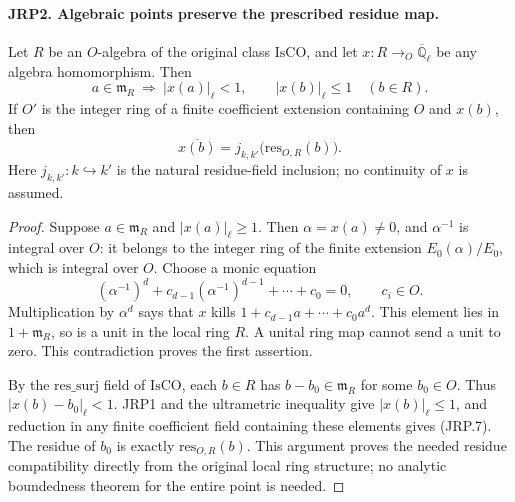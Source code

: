 \documentclass[11pt,a4paper]{article}
\numberwithin{equation}{section}
\theoremstyle{remark}\newtheorem{remark}[theorem]{Remark}
\begin{document}
\paragraph{JRP2. Algebraic points preserve the prescribed residue map.}
\label{claim:JRP2}
Let \(R\) be an \(O\)-algebra of the original class
\(\mathrm{IsCO}\), and let
\(x:R\to_O\overline{\mathbb Q}_\ell\) be any algebra homomorphism.
Then
\[
 a\in\mathfrak m_R\ \Longrightarrow\ |x(a)|_\ell<1,
 \qquad |x(b)|_\ell\le1\quad(b\in R).
 \tag{JRP.6}
\]
If \(O'\) is the integer ring of a finite coefficient extension
containing \(O\) and \(x(b)\), then
\[
 \overline{x(b)}=j_{k,k'}\bigl(\mathrm{res}_{O,R}(b)\bigr).
 \tag{JRP.7}
\]
Here \(j_{k,k'}:k\hookrightarrow k'\) is the natural residue-field
inclusion; no continuity of \(x\) is assumed.
\begin{proof}
Suppose \(a\in\mathfrak m_R\) and \(|x(a)|_\ell\ge1\).
Then \(\alpha=x(a)\ne0\), and \(\alpha^{-1}\) is integral
over \(O\): it belongs to the integer ring of the finite extension
\(E_0(\alpha)/E_0\), which is integral over \(O\).
Choose a monic equation
\[
 (\alpha^{-1})^d+c_{d-1}(\alpha^{-1})^{d-1}
                    +\cdots+c_0=0,\qquad c_i\in O.
\]
Multiplication by \(\alpha^d\) says that \(x\) kills
\(1+c_{d-1}a+\cdots+c_0a^d\).  This element lies in
\(1+\mathfrak m_R\), so is a unit in the local ring \(R\).
A unital ring map cannot send a unit to zero.  This contradiction
proves the first assertion.

By the \(\mathrm{res\_\allowbreak surj}\) field of \(\mathrm{IsCO}\),
each \(b\in R\) has \(b-b_0\in\mathfrak m_R\) for some
\(b_0\in O\).  Thus \(|x(b)-b_0|_\ell<1\).
JRP1 and the ultrametric inequality give \(|x(b)|_\ell\le1\),
and reduction in any finite coefficient field containing these
elements gives (JRP.7).  The residue of \(b_0\) is exactly
\(\mathrm{res}_{O,R}(b)\).  This argument proves the needed
residue compatibility directly from the original local ring
structure; no analytic boundedness theorem for the entire point is
needed.
\end{proof}

\end{document}
